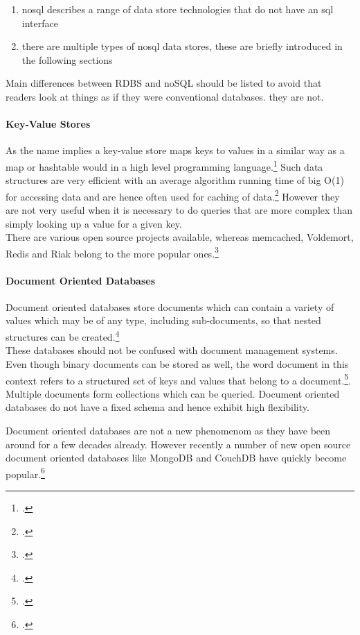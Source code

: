 \begin{enumerate}
  \item nosql describes a range of data store technologies that do not have an sql interface
  \item there are multiple types of nosql data stores, these are briefly introduced in the following sections
\end{enumerate}
Main differences between RDBS and noSQL should be listed to avoid that readers
look at things as if they were conventional databases. they are not.

\paragraph{Key-Value Stores}
\label{sec:nosql-key-value}
As the name implies a key-value store maps keys to values in a similar way as a
map or hashtable would in a high level programming
language.\footcite[Cf.][4]{Redmond_2012} Such data structures are very efficient
with an average algorithm running time of big O(1) for accessing data and
are hence often used for caching of data.\footcite[Cf.][p. 14 et sq.]{Tiwari_2011}
However they are not very useful when it is necessary to do queries that are
more complex than simply looking up a value for a given key.\\
There are various open source projects available, whereas memcached, Voldemort,
Redis and Riak belong to the more popular ones.\footcite[Cf.][4]{Redmond_2012}

 
\paragraph{Document Oriented Databases}
\label{sec:nosql-document}
Document oriented databases store documents which can contain a variety of
values which may be of any type, including sub-documents, so that nested 
structures can be created.\footcite[Cf.][p. 5 et sq.]{Redmond_2012}\\
These databases should not be confused with document management systems. Even
though binary documents can be stored as well, the word document in this context
refers to a structured set of keys and values that belong to a
document.\footcite[Cf.][p. 18 et sq.]{Tiwari_2011}.\\
Multiple documents form collections which can be queried. Document oriented
databases do not have a fixed schema and hence exhibit high flexibility.

Document oriented databases are not a new phenomenom as they have been around
for a few decades already. However recently a number of new open source document 
oriented databases like MongoDB and CouchDB have quickly become popular.\footcite[Cf.][p. 18 et sq.]{Tiwari_2011}


